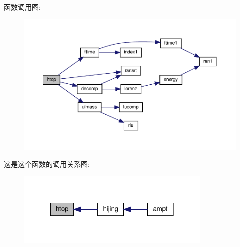 函数调用图\+:
\nopagebreak
\begin{figure}[H]
\begin{center}
\leavevmode
\includegraphics[width=350pt]{htop_8f90_a6f52b189057b77504ea54a3364c702f4_cgraph}
\end{center}
\end{figure}
这是这个函数的调用关系图\+:
\nopagebreak
\begin{figure}[H]
\begin{center}
\leavevmode
\includegraphics[width=264pt]{htop_8f90_a6f52b189057b77504ea54a3364c702f4_icgraph}
\end{center}
\end{figure}

